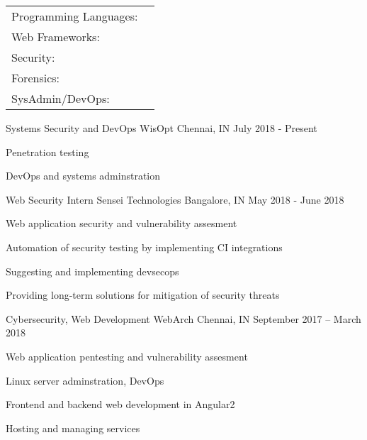 \documentclass[]{awesome-cv}
\begin{document}
\begin{cventries}
	\cventry
	{}
	{\def\arraystretch{1.15}{\begin{tabular}{ l l }
		Programming Languages:  & {\skill{ Python, Shell, Nim, C, JS, PHP, HTML/CSS}} \\
		Web Frameworks:  & {\skill{ Flask, Angular2, Hugo, Bootstrap, Materialize/MDL}} \\
		Security: & {\skill{ Vulnerability Assessment, Web Security, Penetration Testing, Networking}} \\
		Forensics: & {\skill{ Filesystems, Data Recovery}} \\
		SysAdmin/DevOps:  & {\skill{ Unix tools/CLI, AWS, Digital Ocean, Git, TravisCI}} \\
		\end{tabular}}}
	{}
	{}
	{}
\end{cventries}


\vspace{-10mm}
\begin{cventries}
	\cventry
	{Systems Security and DevOps}
	{WisOpt}
	{Chennai, IN}
	{July 2018 - Present}
	{\begin{cvitems}
		\item {Penetration testing}
		\item {DevOps and systems adminstration}
	\end{cvitems}}
	\cventry
	{Web Security Intern}
	{Sensei Technologies}
	{Bangalore, IN}
	{May 2018 - June 2018}
	{\begin{cvitems}
		\item {Web application security and vulnerability assesment}
		\item {Automation of security testing by implementing CI integrations}
		\item {Suggesting and implementing devsecops}
		\item {Providing long-term solutions for mitigation of security threats}
	\end{cvitems}}
	\cventry
	{Cybersecurity, Web Development}
	{WebArch}
	{Chennai, IN}
	{September 2017 – March 2018}
	{\begin{cvitems}
		\item {Web application pentesting and vulnerability assesment}
		\item {Linux server adminstration, DevOps}
		\item {Frontend and backend web development in Angular2}
		\item {Hosting and managing services}
	\end{cvitems}}
\end{cventries}
\end{document}
